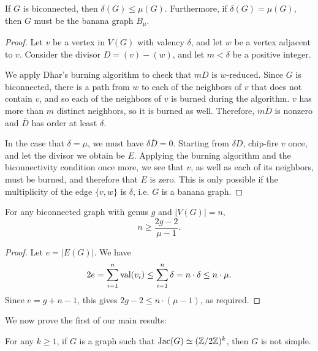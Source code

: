 \documentclass{amsart}
\begin{document}
\begin{lem}
  \label{lem:delta_le_mu}
  If $G$ is biconnected, then $\delta(G) \le \mu(G)$. Furthermore, if
  $\delta(G) = \mu(G)$, then $G$ must be the banana graph $B_\mu$.
\end{lem}
\begin{proof}
  Let $v$ be a vertex in $V(G)$ with valency $\delta$, and let $w$ be
  a vertex adjacent to $v$. Consider the divisor $D = (v) -
  (w)$, and let $m < \delta$ be a positive integer. 

  We apply Dhar's burning algorithm to check that $mD$ is
  $w$-reduced. Since $G$ is biconnected, there is a path from $w$ to
  each of the neighbors of $v$ that does not contain $v$, and so each
  of the neighbors of $v$ is burned during the algorithm. $v$ has more
  than $m$ distinct neighbors, so it is burned as well. Therefore,
  $m\overline{D}$ is nonzero and $\overline{D}$ has order at least
  $\delta$.

  In the case that $\delta = \mu$, we must have $\delta\overline{D} =
  0$. Starting from $\delta D$, chip-fire $v$ once, and let the divisor
  we obtain be $E$. Applying the burning algorithm and the
  biconnectivity condition once more, we see that $v$, as well as each
  of its neighbors, must be burned, and therefore that $E$ is
  zero. This is only possible if the multiplicity of the edge
  $\{v,w\}$ is $\delta$, i.e. $G$ is a banana graph.
\end{proof}

\begin{cor}
  \label{cor:genus_v_mu}
  For any biconnected graph with genus $g$ and $|V(G)| = n$,
  \begin{equation*}
    n \ge \frac{2g - 2}{\mu - 1}.
  \end{equation*}
\end{cor}
\begin{proof}
  Let $e = |E(G)|$. We have 
  \begin{equation*}
    2e = \sum_{i=1}^n \operatorname{val}(v_i) \le \sum_{i=1}^n \delta = n \cdot \delta
    \le n \cdot \mu.
  \end{equation*}
  Since $e = g + n - 1$, this gives $2g - 2 \le n \cdot (\mu - 1)$, as
  required.
\end{proof}

We now prove the first of our main results:

\begin{thm}
  \label{thm:2group}
  For any $k \ge 1$, if $G$ is a graph such that $\operatorname{Jac}(G) \simeq
  (\mathbb{Z}/2\mathbb{Z})^k$, then $G$ is not simple.
\end{thm}
\end{document}
